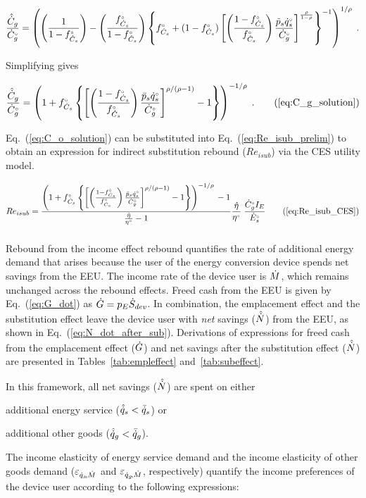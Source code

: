 \begin{equation}
  \frac{\hat{\dot{C}}_g}{{}{\dot{C}}^{\scriptscriptstyle \circ}_g} = \left( \left( \frac{1}{1-{}{f}^{\scriptscriptstyle \circ}_{\dot{C}_s}} \right)
                                     - \left( \frac{{}{f}^{\scriptscriptstyle \circ}_{\dot{C}_s}}{1-{}{f}^{\scriptscriptstyle \circ}_{\dot{C}_s}} \right)
              \left\{ {}{f}^{\scriptscriptstyle \circ}_{\dot{C}_s} + (1-{}{f}^{\scriptscriptstyle \circ}_{\dot{C}_s})
                  \left[ \left( \frac{1-{}{f}^{\scriptscriptstyle \circ}_{\dot{C}_s}}{{}{f}^{\scriptscriptstyle \circ}_{\dot{C}_s}} \right) \frac{\tilde{p}_s {}{\dot{q}}^{\scriptscriptstyle \circ}_s}{{}{\dot{C}}^{\scriptscriptstyle \circ}_g}   \right]
                      ^{\frac{\rho}{1-\rho}} \right\} ^{-1} \right) ^{1/\rho} \; .
\end{equation}

Simplifying gives

\begin{equation}
  \frac{\rasub{C}_g}{\rbempl{C}_g} = \Cgsolution{} \; . \tag{\ref{eq:C_g_solution}}
\end{equation}

Eq.~(\ref{eq:C_o_solution}) can be substituted into Eq.~(\ref{eq:Re_isub_prelim})
to obtain an expression for indirect substitution rebound ($Re_{isub}$)
via the CES utility model.

\begin{equation}
  Re_{isub} = \ReisubCES{} \tag{\ref{eq:Re_isub_CES}}
\end{equation}


\subsubsection{\Inceffect{}}
\label{sec:Re_inc}

Rebound from the income effect rebound quantifies the rate of additional energy demand
that arises because the user of the energy conversion device spends net
savings from the EEU.
The income rate of the device user is $\dot{M}$,
which remains unchanged across the rebound effects.
Freed cash from the EEU is given by Eq.~(\ref{eq:G_dot})
as $\dot{G} = p_E \dot{S}_{dev}$.
In combination, the emplacement effect and
the substitution effect leave the device user with
\emph{net} savings ($\hat{\dot{N}}$) from the EEU,
as shown in Eq.~(\ref{eq:N_dot_after_sub}).
Derivations of expressions for
freed cash from the emplacement effect ($\dot{G}$) and
net savings after the substitution effect ($\hat{\dot{N}}$)
are presented in Tables~\ref{tab:empleffect} and~\ref{tab:subeffect}.

In this framework, all net savings ($\hat{\dot{N}}$) are spent on either
%
\begin{enumerate*}[label={(\roman*)}]

  \item additional energy service
        ($\hat{\dot{q}}_s < \bar{\dot{q}}_s$) or

  \item additional other goods
        ($\hat{\dot{q}}_g < \bar{\dot{q}}_g$).

\end{enumerate*}
%
The income elasticity of energy service demand and
the income elasticity of other goods demand
($\varepsilon_{\dot{q}_s\!,\dot{M}}$ and $\varepsilon_{\dot{q}_g\!,\dot{M}}$, respectively)
quantify the income preferences of the device user according to the following expressions:

